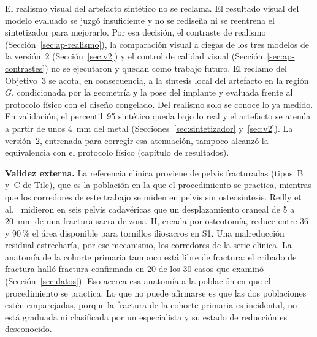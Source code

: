 El realismo visual del artefacto sintético no se reclama. El resultado visual del modelo evaluado se juzgó insuficiente y no se rediseña ni se reentrena el sintetizador para mejorarlo. Por esa decisión, el contraste de realismo (Sección~\ref{sec:ap-realismo}), la comparación visual a ciegas de los tres modelos de la versión~2 (Sección~\ref{sec:v2}) y el control de calidad visual (Sección~\ref{sec:ap-contrastes}) no se ejecutaron y quedan como trabajo futuro.    El reclamo del Objetivo~3 se acota, en consecuencia, a la síntesis local del artefacto en la región $G$, condicionada por la geometría y la pose del implante y evaluada frente al protocolo físico con el diseño congelado. Del realismo solo se conoce lo ya medido. En validación, el percentil~95 sintético queda bajo lo real y el artefacto se atenúa a partir de unos 4~mm del metal (Secciones~\ref{sec:sintetizador} y~\ref{sec:v2}). La versión~2, entrenada para corregir esa atenuación, tampoco alcanzó la equivalencia con el protocolo físico (capítulo de resultados).

\textbf{Validez externa.} La referencia clínica proviene de pelvis fracturadas (tipos~B y~C de Tile), que es la población en la que el procedimiento se practica, mientras que los corredores de este trabajo se miden en pelvis sin osteosíntesis. Reilly et al.~\cite{reilly2003effect} midieron en seis pelvis cadavéricas que un desplazamiento craneal de 5 a 20~mm de una fractura sacra de zona~II, creada por osteotomía, reduce entre 36 y 90\,\% el área disponible para tornillos iliosacros en S1. Una malreducción residual estrecharía, por ese mecanismo, los corredores de la serie clínica. La anatomía de la cohorte primaria tampoco está libre de fractura: el cribado de fractura halló fractura confirmada en 20 de los 30 casos que examinó (Sección~\ref{sec:datos}). Eso acerca esa anatomía a la población en que el procedimiento se practica. Lo que no puede afirmarse es que las dos poblaciones estén emparejadas, porque la fractura de la cohorte primaria es incidental, no está graduada ni clasificada por un especialista y su estado de reducción es desconocido.

